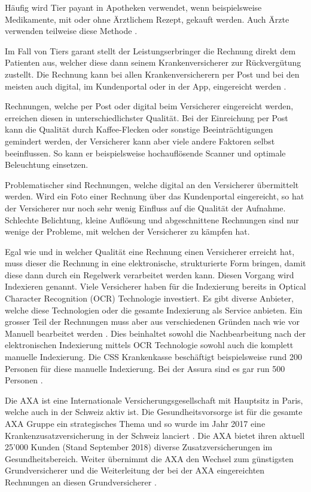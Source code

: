 \documentclass[12pt, twoside, table]{extarticle}
\begin{document}
Häufig wird Tier payant in Apotheken verwendet, wenn beispielsweise Medikamente, mit oder ohne Ärztlichem Rezept, gekauft werden. Auch Ärzte verwenden teilweise diese Methode .

Im Fall von Tiers garant stellt der Leistungserbringer die Rechnung direkt dem Patienten aus, welcher diese dann seinem Krankenversicherer zur Rückvergütung zustellt. Die Rechnung kann bei allen Krankenversicherern per Post und bei den meisten auch digital, im Kundenportal oder in der App, eingereicht werden \cite{EidgenossischesDepartementdesInnern2017FaktenblattVergutungssysteme}.

Rechnungen, welche per Post oder digital beim Versicherer eingereicht werden, erreichen diesen in unterschiedlichster Qualität. Bei der Einreichung per Post kann die Qualität durch Kaffee-Flecken oder sonstige Beeinträchtigungen gemindert werden, der Versicherer kann aber viele andere Faktoren selbst beeinflussen. So kann er beispielsweise hochauflösende Scanner und optimale Beleuchtung einsetzen.

Problematischer sind Rechnungen, welche digital an den Versicherer übermittelt werden. Wird ein Foto einer Rechnung über das Kundenportal eingereicht, so hat der Versicherer nur noch sehr wenig Einfluss auf die Qualität der Aufnahme. Schlechte Belichtung, kleine Auflösung und abgeschnittene Rechnungen sind nur wenige der Probleme, mit welchen der Versicherer zu kämpfen hat.

Egal wie und in welcher Qualität eine Rechnung einen Versicherer erreicht hat, muss dieser die Rechnung in eine elektronische, strukturierte Form bringen, damit diese dann durch ein Regelwerk verarbeitet werden kann. Diesen Vorgang wird Indexieren genannt. Viele Versicherer haben für die Indexierung bereits in Optical Character Recognition (OCR) Technologie investiert. Es gibt diverse Anbieter, welche diese Technologien oder die gesamte Indexierung als Service anbieten. Ein grosser Teil der Rechnungen muss aber aus verschiedenen Gründen nach wie vor Manuell bearbeitet werden . Dies beinhaltet sowohl die Nachbearbeitung nach der elektronischen Indexierung mittels OCR Technologie sowohl auch die komplett manuelle Indexierung. Die CSS Krankenkasse beschäftigt beispielsweise rund 200 Personen für diese manuelle Indexierung. Bei der Assura sind es gar run 500 Personen .

Die AXA ist eine Internationale Versicherungsgesellschaft mit Hauptsitz in Paris, welche auch in der Schweiz aktiv ist. Die Gesundheitsvorsorge ist für die gesamte AXA Gruppe ein strategisches Thema und so wurde im Jahr 2017 eine Krankenzusatzversicherung in der Schweiz lanciert \cite{finanzen.ch2017AxaGewinnen}. Die AXA bietet ihren aktuell 25'000 Kunden (Stand September 2018)  diverse Zusatzversicherungen im Gesundheitsbereich. Weiter übernimmt die AXA den Wechsel zum günstigsten Grundversicherer und die Weiterleitung der bei der AXA eingereichten Rechnungen an diesen Grundversicherer \cite{finanzen.ch2017AxaGewinnen}.
\end{document}
